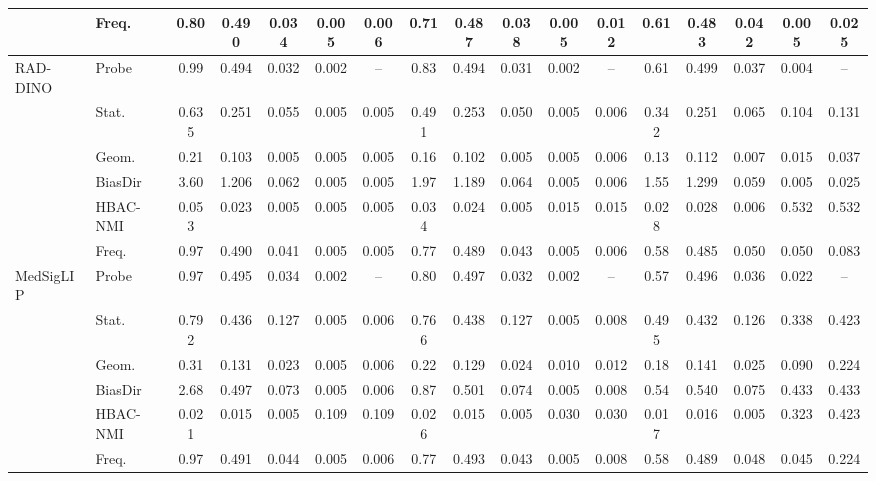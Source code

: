 \begin{tabular}{llccccccccccccccc}
 & Freq. & 0.80 & 0.490 & 0.034 & 0.005 & 0.006 & 0.71 & 0.487 & 0.038 & 0.005 & 0.012 & 0.61 & 0.483 & 0.042 & 0.005 & 0.025 \\
\midrule
RAD-DINO & Probe & 0.99 & 0.494 & 0.032 & 0.002 & -- & 0.83 & 0.494 & 0.031 & 0.002 & -- & 0.61 & 0.499 & 0.037 & 0.004 & -- \\
 & Stat. & 0.635 & 0.251 & 0.055 & 0.005 & 0.005 & 0.491 & 0.253 & 0.050 & 0.005 & 0.006 & 0.342 & 0.251 & 0.065 & 0.104 & 0.131 \\
 & Geom. & 0.21 & 0.103 & 0.005 & 0.005 & 0.005 & 0.16 & 0.102 & 0.005 & 0.005 & 0.006 & 0.13 & 0.112 & 0.007 & 0.015 & 0.037 \\
 & BiasDir & 3.60 & 1.206 & 0.062 & 0.005 & 0.005 & 1.97 & 1.189 & 0.064 & 0.005 & 0.006 & 1.55 & 1.299 & 0.059 & 0.005 & 0.025 \\
 & HBAC-NMI & 0.053 & 0.023 & 0.005 & 0.005 & 0.005 & 0.034 & 0.024 & 0.005 & 0.015 & 0.015 & 0.028 & 0.028 & 0.006 & 0.532 & 0.532 \\
 & Freq. & 0.97 & 0.490 & 0.041 & 0.005 & 0.005 & 0.77 & 0.489 & 0.043 & 0.005 & 0.006 & 0.58 & 0.485 & 0.050 & 0.050 & 0.083 \\
\midrule
MedSigLIP & Probe & 0.97 & 0.495 & 0.034 & 0.002 & -- & 0.80 & 0.497 & 0.032 & 0.002 & -- & 0.57 & 0.496 & 0.036 & 0.022 & -- \\
 & Stat. & 0.792 & 0.436 & 0.127 & 0.005 & 0.006 & 0.766 & 0.438 & 0.127 & 0.005 & 0.008 & 0.495 & 0.432 & 0.126 & 0.338 & 0.423 \\
 & Geom. & 0.31 & 0.131 & 0.023 & 0.005 & 0.006 & 0.22 & 0.129 & 0.024 & 0.010 & 0.012 & 0.18 & 0.141 & 0.025 & 0.090 & 0.224 \\
 & BiasDir & 2.68 & 0.497 & 0.073 & 0.005 & 0.006 & 0.87 & 0.501 & 0.074 & 0.005 & 0.008 & 0.54 & 0.540 & 0.075 & 0.433 & 0.433 \\
 & HBAC-NMI & 0.021 & 0.015 & 0.005 & 0.109 & 0.109 & 0.026 & 0.015 & 0.005 & 0.030 & 0.030 & 0.017 & 0.016 & 0.005 & 0.323 & 0.423 \\
 & Freq. & 0.97 & 0.491 & 0.044 & 0.005 & 0.006 & 0.77 & 0.493 & 0.043 & 0.005 & 0.008 & 0.58 & 0.489 & 0.048 & 0.045 & 0.224 \\
\bottomrule
\end{tabular}
